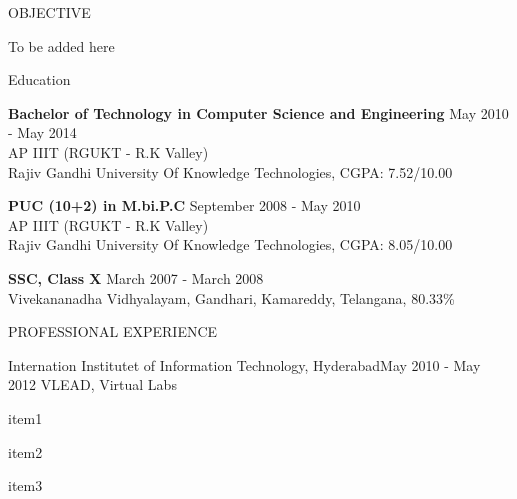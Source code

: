 \documentclass{resume} %
\begin{document}

\begin{rSection}{OBJECTIVE}
  
  { To be added here }


\end{rSection}

\begin{rSection}{Education}

{\bf Bachelor of Technology in Computer Science and Engineering} \hfill {May 2010 - May 2014}
\\ 
AP IIIT (RGUKT - R.K Valley)
\\
Rajiv Gandhi University Of Knowledge Technologies,  CGPA: 7.52/10.00  

{\bf PUC (10+2) in M.bi.P.C} \hfill {September 2008 - May 2010}
\\
AP IIIT (RGUKT - R.K Valley)
\\
Rajiv Gandhi University Of Knowledge Technologies,  CGPA: 8.05/10.00  

{\textbf{SSC, Class X}}  \hfill March 2007 - March  2008\\
Vivekananadha Vidhyalayam, Gandhari, Kamareddy, Telangana, 80.33\% 


\end{rSection}

\begin{rSection}{PROFESSIONAL EXPERIENCE}

  \begin{rSubsection}
    {Internation Institutet of Information Technology, Hyderabad}{May 2010 -
      May 2012}
    {VLEAD, Virtual Labs} {} 
  \item item1
  \item item2
  \item item3
    
  \end{rSubsection}



 
\end{rSection}
\end{document}
